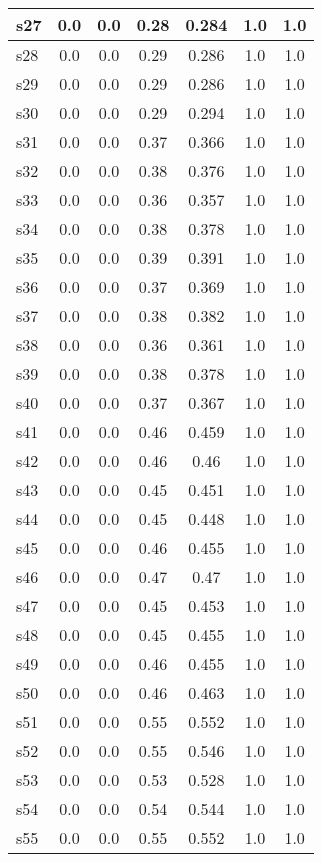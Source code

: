 \documentclass{article}
\begin{document}
\begin{tabular}{|l|c|c|c|c|c|c|}
s27 &0.0 & 0.0 & 0.28 & 0.284 & 1.0 & 1.0\\
\hline
s28 &0.0 & 0.0 & 0.29 & 0.286 & 1.0 & 1.0\\
\hline
s29 &0.0 & 0.0 & 0.29 & 0.286 & 1.0 & 1.0\\
\hline
s30 &0.0 & 0.0 & 0.29 & 0.294 & 1.0 & 1.0\\
\hline
s31 &0.0 & 0.0 & 0.37 & 0.366 & 1.0 & 1.0\\
\hline
s32 &0.0 & 0.0 & 0.38 & 0.376 & 1.0 & 1.0\\
\hline
s33 &0.0 & 0.0 & 0.36 & 0.357 & 1.0 & 1.0\\
\hline
s34 &0.0 & 0.0 & 0.38 & 0.378 & 1.0 & 1.0\\
\hline
s35 &0.0 & 0.0 & 0.39 & 0.391 & 1.0 & 1.0\\
\hline
s36 &0.0 & 0.0 & 0.37 & 0.369 & 1.0 & 1.0\\
\hline
s37 &0.0 & 0.0 & 0.38 & 0.382 & 1.0 & 1.0\\
\hline
s38 &0.0 & 0.0 & 0.36 & 0.361 & 1.0 & 1.0\\
\hline
s39 &0.0 & 0.0 & 0.38 & 0.378 & 1.0 & 1.0\\
\hline
s40 &0.0 & 0.0 & 0.37 & 0.367 & 1.0 & 1.0\\
\hline
s41 &0.0 & 0.0 & 0.46 & 0.459 & 1.0 & 1.0\\
\hline
s42 &0.0 & 0.0 & 0.46 & 0.46 & 1.0 & 1.0\\
\hline
s43 &0.0 & 0.0 & 0.45 & 0.451 & 1.0 & 1.0\\
\hline
s44 &0.0 & 0.0 & 0.45 & 0.448 & 1.0 & 1.0\\
\hline
s45 &0.0 & 0.0 & 0.46 & 0.455 & 1.0 & 1.0\\
\hline
s46 &0.0 & 0.0 & 0.47 & 0.47 & 1.0 & 1.0\\
\hline
s47 &0.0 & 0.0 & 0.45 & 0.453 & 1.0 & 1.0\\
\hline
s48 &0.0 & 0.0 & 0.45 & 0.455 & 1.0 & 1.0\\
\hline
s49 &0.0 & 0.0 & 0.46 & 0.455 & 1.0 & 1.0\\
\hline
s50 &0.0 & 0.0 & 0.46 & 0.463 & 1.0 & 1.0\\
\hline
s51 &0.0 & 0.0 & 0.55 & 0.552 & 1.0 & 1.0\\
\hline
s52 &0.0 & 0.0 & 0.55 & 0.546 & 1.0 & 1.0\\
\hline
s53 &0.0 & 0.0 & 0.53 & 0.528 & 1.0 & 1.0\\
\hline
s54 &0.0 & 0.0 & 0.54 & 0.544 & 1.0 & 1.0\\
\hline
s55 &0.0 & 0.0 & 0.55 & 0.552 & 1.0 & 1.0\\

\end{tabular}
\end{document}
